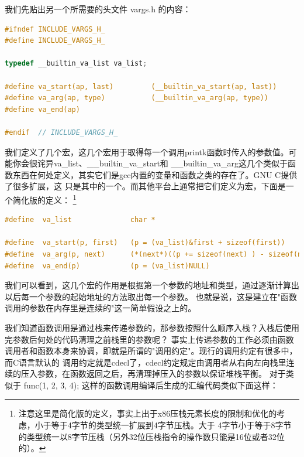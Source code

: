 \par 我们先贴出另一个所需要的头文件 vargs.h 的内容：

\begin{lstlisting}[language = C, caption = include/vargs.h]
#ifndef INCLUDE_VARGS_H_
#define INCLUDE_VARGS_H_

typedef __builtin_va_list va_list;

#define va_start(ap, last)         (__builtin_va_start(ap, last))
#define va_arg(ap, type)           (__builtin_va_arg(ap, type))
#define va_end(ap) 

#endif 	// INCLUDE_VARGS_H_
\end{lstlisting}

\par 我们定义了几个宏，这几个宏用于取得每一个调用printk函数时传入的参数值。可能你会很诧异va\_list、\_\_builtin\_va\_start和\allowbreak
\_\_builtin\_va\_arg这几个类似于函数东西在何处定义，其实它们是gcc内置的变量和函数之类的存在了。GNU C提供了很多扩展，这\allowbreak
只是其中的一个。而其他平台上通常把它们定义为宏，下面是一个简化版的定义：\allowbreak
\footnote{注意这里是简化版的定义，事实上出于x86压栈元素长度的限制和优化的考虑，小于等于4字节的类型统一扩展到4字节压栈。大于\allowbreak
4字节小于等于8字节的类型统一以8字节压栈（另外32位压栈指令的操作数只能是16位或者32位的）。}

\begin{lstlisting}[language = C, caption = 可变形参表]
#define  va_list              char *

#define  va_start(p, first)   (p = (va_list)&first + sizeof(first))
#define  va_arg(p, next)      (*(next*)((p += sizeof(next) ) - sizeof(next)))
#define  va_end(p)            (p = (va_list)NULL)
\end{lstlisting}

\par 我们可以看到，这几个宏的作用是根据第一个参数的地址和类型，通过逐渐计算出以后每一个参数的起始地址的方法取出每一个参数。\allowbreak
也就是说，这是建立在"函数调用的参数在内存里是连续的"这一简单假设之上的。

\par 我们知道函数调用是通过栈来传递参数的，那参数按照什么顺序入栈？入栈后使用完参数后何处的代码清理之前栈里的参数呢？\allowbreak
事实上传递参数的工作必须由函数调用者和函数本身来协调，即就是所谓的"调用约定"。现行的调用约定有很多中，而C语言默认的\allowbreak
调用约定就是cdecl了，cdecl约定规定由调用者从右向左向栈里连续的压入参数，在函数返回之后，再清理掉压入的参数以保证堆栈平衡。\allowbreak
对于类似于 func(1, 2, 3, 4); 这样的函数调用编译后生成的汇编代码类似下面这样：

